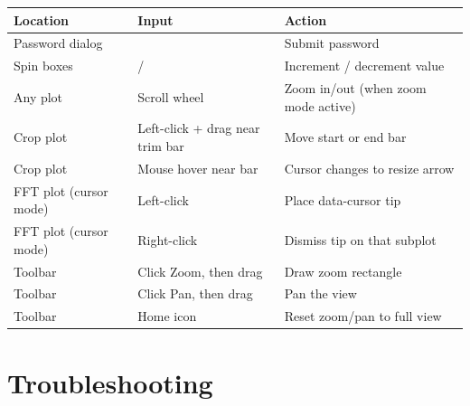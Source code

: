 \documentclass[12pt, a4paper]{article}
\newcommand{\key}[1]{%
  \fbox{\small\ttfamily #1}%
}
\begin{document}
\begin{center}
\begin{tabularx}{\linewidth}{llX}
\toprule
\textbf{Location} & \textbf{Input} & \textbf{Action}\\
\midrule
Password dialog   & \key{Enter}        & Submit password \\
Spin boxes        & \key{$\uparrow$} / \key{$\downarrow$} & Increment / decrement value \\
Any plot          & Scroll wheel       & Zoom in/out (when zoom mode active) \\
Crop plot         & Left-click + drag near trim bar & Move start or end bar \\
Crop plot         & Mouse hover near bar & Cursor changes to resize arrow \\
FFT plot (cursor mode) & Left-click   & Place data-cursor tip \\
FFT plot (cursor mode) & Right-click  & Dismiss tip on that subplot \\
Toolbar           & Click Zoom, then drag & Draw zoom rectangle \\
Toolbar           & Click Pan, then drag  & Pan the view \\
Toolbar           & Home icon             & Reset zoom/pan to full view \\
\bottomrule
\end{tabularx}
\end{center}

\section{Troubleshooting}
\end{document}
